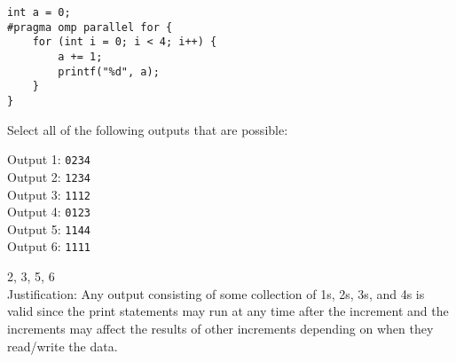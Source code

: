 \begin{blocksection}

\question
\begin{verbatim}
int a = 0;
#pragma omp parallel for {
    for (int i = 0; i < 4; i++) {
        a += 1;
        printf("%d", a);
    }
}
\end{verbatim}

Select all of the following outputs that are possible:

Output 1: \texttt{0234} \\
Output 2: \texttt{1234} \\
Output 3: \texttt{1112} \\
Output 4: \texttt{0123} \\
Output 5: \texttt{1144} \\
Output 6: \texttt{1111} \\

\begin{solution}[0.5in]
2, 3, 5, 6\\
Justification: Any output consisting of some collection of 1s, 2s, 3s, and 4s is valid since the print statements may run at any time after the increment and the increments may affect the results of other increments depending on when they read/write the data.

\end{solution}
\end{blocksection}